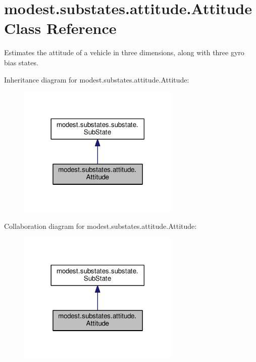 \hypertarget{classmodest_1_1substates_1_1attitude_1_1Attitude}{}\section{modest.\+substates.\+attitude.\+Attitude Class Reference}
\label{classmodest_1_1substates_1_1attitude_1_1Attitude}


Estimates the attitude of a vehicle in three dimensions, along with three gyro bias states.  




Inheritance diagram for modest.\+substates.\+attitude.\+Attitude\+:\nopagebreak
\begin{figure}[H]
\begin{center}
\leavevmode
\includegraphics[width=218pt]{classmodest_1_1substates_1_1attitude_1_1Attitude__inherit__graph}
\end{center}
\end{figure}


Collaboration diagram for modest.\+substates.\+attitude.\+Attitude\+:\nopagebreak
\begin{figure}[H]
\begin{center}
\leavevmode
\includegraphics[width=218pt]{classmodest_1_1substates_1_1attitude_1_1Attitude__coll__graph}
\end{center}
\end{figure}
